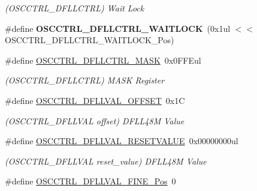 \begin{DoxyCompactItemize}
\begin{DoxyCompactList}\small\item\em (O\+S\+C\+C\+T\+R\+L\+\_\+\+D\+F\+L\+L\+C\+T\+R\+L) Wait Lock \end{DoxyCompactList}\item 
\hypertarget{group___s_a_m_l21___o_s_c_c_t_r_l_ga2ef07487e1e7b35a1bf666b577b63f76}{}\#define {\bfseries O\+S\+C\+C\+T\+R\+L\+\_\+\+D\+F\+L\+L\+C\+T\+R\+L\+\_\+\+W\+A\+I\+T\+L\+O\+C\+K}~(0x1ul $<$$<$ O\+S\+C\+C\+T\+R\+L\+\_\+\+D\+F\+L\+L\+C\+T\+R\+L\+\_\+\+W\+A\+I\+T\+L\+O\+C\+K\+\_\+\+Pos)\label{group___s_a_m_l21___o_s_c_c_t_r_l_ga2ef07487e1e7b35a1bf666b577b63f76}

\item 
\hypertarget{group___s_a_m_l21___o_s_c_c_t_r_l_gaffaba192e967d266dba91bf7f781e05b}{}\#define \hyperlink{group___s_a_m_l21___o_s_c_c_t_r_l_gaffaba192e967d266dba91bf7f781e05b}{O\+S\+C\+C\+T\+R\+L\+\_\+\+D\+F\+L\+L\+C\+T\+R\+L\+\_\+\+M\+A\+S\+K}~0x0\+F\+F\+Eul\label{group___s_a_m_l21___o_s_c_c_t_r_l_gaffaba192e967d266dba91bf7f781e05b}

\begin{DoxyCompactList}\small\item\em (O\+S\+C\+C\+T\+R\+L\+\_\+\+D\+F\+L\+L\+C\+T\+R\+L) M\+A\+S\+K Register \end{DoxyCompactList}\item 
\hypertarget{group___s_a_m_l21___o_s_c_c_t_r_l_ga73984d1b76d49184781e4b3f31114b2f}{}\#define \hyperlink{group___s_a_m_l21___o_s_c_c_t_r_l_ga73984d1b76d49184781e4b3f31114b2f}{O\+S\+C\+C\+T\+R\+L\+\_\+\+D\+F\+L\+L\+V\+A\+L\+\_\+\+O\+F\+F\+S\+E\+T}~0x1\+C\label{group___s_a_m_l21___o_s_c_c_t_r_l_ga73984d1b76d49184781e4b3f31114b2f}

\begin{DoxyCompactList}\small\item\em (O\+S\+C\+C\+T\+R\+L\+\_\+\+D\+F\+L\+L\+V\+A\+L offset) D\+F\+L\+L48\+M Value \end{DoxyCompactList}\item 
\hypertarget{group___s_a_m_l21___o_s_c_c_t_r_l_ga698a0db24626335bd0120330a28bdfc3}{}\#define \hyperlink{group___s_a_m_l21___o_s_c_c_t_r_l_ga698a0db24626335bd0120330a28bdfc3}{O\+S\+C\+C\+T\+R\+L\+\_\+\+D\+F\+L\+L\+V\+A\+L\+\_\+\+R\+E\+S\+E\+T\+V\+A\+L\+U\+E}~0x00000000ul\label{group___s_a_m_l21___o_s_c_c_t_r_l_ga698a0db24626335bd0120330a28bdfc3}

\begin{DoxyCompactList}\small\item\em (O\+S\+C\+C\+T\+R\+L\+\_\+\+D\+F\+L\+L\+V\+A\+L reset\+\_\+value) D\+F\+L\+L48\+M Value \end{DoxyCompactList}\item 
\hypertarget{group___s_a_m_l21___o_s_c_c_t_r_l_gacbf24eb2695191929f7fe5384e93ac82}{}\#define \hyperlink{group___s_a_m_l21___o_s_c_c_t_r_l_gacbf24eb2695191929f7fe5384e93ac82}{O\+S\+C\+C\+T\+R\+L\+\_\+\+D\+F\+L\+L\+V\+A\+L\+\_\+\+F\+I\+N\+E\+\_\+\+Pos}~0\label{group___s_a_m_l21___o_s_c_c_t_r_l_gacbf24eb2695191929f7fe5384e93ac82}


\end{DoxyCompactItemize}
